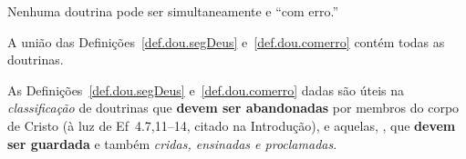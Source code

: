     \begin{COR}
        \label{cor.dicotomia.1}
        Nenhuma doutrina pode ser simultaneamente  e ``com erro.''
    \end{COR}

    \begin{COR}
        \label{cor.dicotomia.2}
        A união das Definições~\ref{def.dou.segDeus} e~\ref{def.dou.comerro} contém todas as doutrinas.
    \end{COR}

    As Definições~\ref{def.dou.segDeus} e~\ref{def.dou.comerro}  dadas  são  úteis  na  \emph{classificação}  de  doutrinas  que
    \textbf{devem ser abandonadas} por membros do corpo de Cristo (à luz de Ef~4.7,11--14, citado  na  Introdução),  e  aquelas,
    , que \textbf{devem ser guardada} e também \emph{cridas, ensinadas e proclamadas}.


